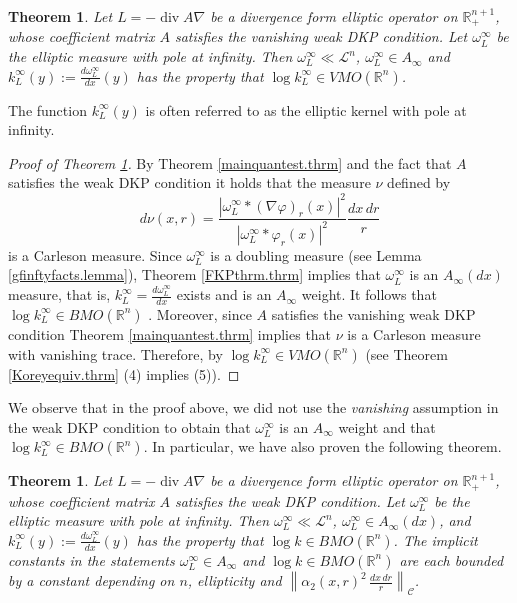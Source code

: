 \documentclass[11pt, a4paper,leqno]{amsart}
\theoremstyle{plain}
\newtheorem{theorem}[equation]{Theorem}
\theoremstyle{definition}
\theoremstyle{remark}
\numberwithin{equation}{section}
\newcommand{\rn}{\mathbb{R}^n}
\newcommand{\ree}{\mathbb{R}^{n+1}}
\newcommand{\hm}{\omega}
\def\div{\mathop{\operatorname{div}}\nolimits}
\begin{document}
\begin{theorem}\label{mainvmopt1.thrm}
Let $L = -\div A\nabla$ be a divergence form elliptic operator on $\ree_+$, whose coefficient matrix $A$ satisfies the vanishing weak DKP condition. Let $\hm^\infty_L$ be the elliptic measure with pole at infinity. Then $\hm^\infty_L \ll \mathcal{L}^n$, $\hm^\infty_L  \in A_\infty$ and $k^\infty_L(y) := \tfrac{d\hm^\infty_L}{dx}(y)$ has the property that $\log k^\infty_L \in VMO(\rn)$. 
\end{theorem}
The function $k^\infty_L(y)$ is often referred to as the elliptic kernel with pole at infinity. 
\begin{proof}[Proof of Theorem \ref{mainvmopt1.thrm}]

By Theorem \ref{mainquantest.thrm} and the fact that $A$ satisfies the weak DKP condition it holds that the measure $\nu$ defined by
\[d\nu(x,r) = \frac{|\omega_L^\infty \ast (\nabla \varphi)_r(x)|^2}{|\omega_L^\infty \ast \varphi_r(x)|^2} \frac{dx \, dr}{r}\]
is a Carleson measure. Since $\hm_L^\infty$ is a doubling measure (see Lemma \ref{gfinftyfacts.lemma}), Theorem \ref{FKPthrm.thrm} implies that $\hm_L^\infty$ is an $A_\infty(dx)$ measure, that is, $k^\infty_L = \tfrac{d\hm_L^\infty}{dx}$ exists and is an $A_\infty$ weight. It follows that $\log k^\infty_L \in BMO(\rn)$ \cite{GCRDF}. Moreover, since $A$ satisfies the vanishing weak DKP condition Theorem \ref{mainquantest.thrm} implies that $\nu$ is a Carleson measure with vanishing trace. Therefore, by \cite[Theorem 1]{Kor} $\log k^\infty_L \in VMO(\rn)$ (see Theorem \ref{Koreyequiv.thrm} (4) implies (5)).
\end{proof}

We observe that in the proof above, we did not use the {\it vanishing} assumption in the weak DKP condition to obtain that $\hm_L^\infty$ is an $A_\infty$ weight and that 
$\log k^\infty_L \in BMO(\rn)$. In particular, we have also proven the following theorem.
\begin{theorem}\label{KPalt.thrm}
Let $L = -\div A\nabla$ be a divergence form elliptic operator on $\ree_+$, whose coefficient matrix $A$ satisfies the weak DKP condition. Let $\hm^\infty_L$ be the elliptic measure with pole at infinity. Then $\hm^\infty_L \ll \mathcal{L}^n$, 
$\hm_L^\infty \in A_\infty(dx)$, and $k^\infty_L(y) := \tfrac{d\hm^\infty_L}{dx}(y)$ has the property that $\log k \in BMO(\rn)$. The implicit constants in the statements $\hm_L^\infty \in  A_\infty$ and $\log k \in BMO(\rn)$ are each bounded by a constant depending on $n$, ellipticity and 
$\left\|\alpha_2(x,r)^2 \, \frac{dx\, dr}{r}\right\|_{\mathcal{C}}$.
\end{theorem}
\end{document}
